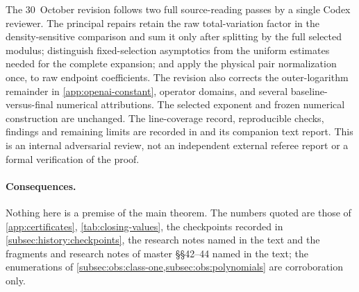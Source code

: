 The 30~October revision follows two full source-reading passes by a single
Codex reviewer. The principal repairs retain the raw total-variation factor
in the density-sensitive comparison and sum it only after splitting by the
full selected modulus; distinguish fixed-selection asymptotics from the
uniform estimates needed for the complete expansion; and apply the physical
pair normalization once, to raw endpoint coefficients. The revision also
corrects the outer-logarithm remainder in \cref{app:openai-constant}, operator
domains, and several baseline-versus-final numerical attributions. The
selected exponent and frozen numerical construction are unchanged. The
line-coverage record, reproducible checks, findings and remaining limits are
recorded in  and its
companion text report. This is an internal adversarial review, not an
independent external referee report or a formal verification of the proof.

\paragraph{Consequences.}
Nothing here is a premise of the main theorem. The numbers quoted are those of
\cref{app:certificates}, \cref{tab:closing-values}, the checkpoints recorded in
\cref{subsec:history:checkpoints}, the research notes named in the text and the
fragments and research notes of master \S\S42--44 named in the text; the
enumerations of \cref{subsec:obs:class-one,subsec:obs:polynomials} are
corroboration only.
